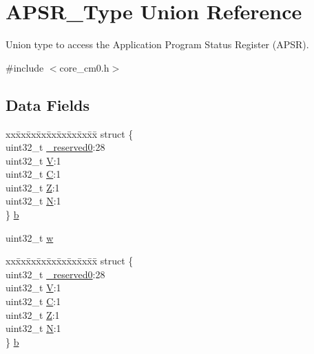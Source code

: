 \hypertarget{union_a_p_s_r___type}{}\section{A\+P\+S\+R\+\_\+\+Type Union Reference}
\label{union_a_p_s_r___type}


Union type to access the Application Program Status Register (A\+P\+SR).  




{\ttfamily \#include $<$core\+\_\+cm0.\+h$>$}

\subsection*{Data Fields}
\begin{DoxyCompactItemize}
\item 
\begin{tabbing}
xx\=xx\=xx\=xx\=xx\=xx\=xx\=xx\=xx\=\kill
struct \{\\
\>uint32\_t \mbox{\hyperlink{union_a_p_s_r___type_ac8a6a13838a897c8d0b8bc991bbaf7c1}{\_reserved0}}:28\\
\>uint32\_t \mbox{\hyperlink{union_a_p_s_r___type_acd4a2b64faee91e4a9eef300667fa222}{V}}:1\\
\>uint32\_t \mbox{\hyperlink{union_a_p_s_r___type_a7a1caf92f32fe9ebd8d1fe89b06c7776}{C}}:1\\
\>uint32\_t \mbox{\hyperlink{union_a_p_s_r___type_a5ae954cbd9986cd64625d7fa00943c8e}{Z}}:1\\
\>uint32\_t \mbox{\hyperlink{union_a_p_s_r___type_abae0610bc2a97bbf7f689e953e0b451f}{N}}:1\\
\} \mbox{\hyperlink{union_a_p_s_r___type_a2e5b85cff450c7f92c7388dd09f10065}{b}}\\

\end{tabbing}\item 
uint32\+\_\+t \mbox{\hyperlink{union_a_p_s_r___type_ad0fb62e7a08e70fc5e0a76b67809f84b}{w}}
\item 
\begin{tabbing}
xx\=xx\=xx\=xx\=xx\=xx\=xx\=xx\=xx\=\kill
struct \{\\
\>uint32\_t \mbox{\hyperlink{union_a_p_s_r___type_ac8a6a13838a897c8d0b8bc991bbaf7c1}{\_reserved0}}:28\\
\>uint32\_t \mbox{\hyperlink{union_a_p_s_r___type_acd4a2b64faee91e4a9eef300667fa222}{V}}:1\\
\>uint32\_t \mbox{\hyperlink{union_a_p_s_r___type_a7a1caf92f32fe9ebd8d1fe89b06c7776}{C}}:1\\
\>uint32\_t \mbox{\hyperlink{union_a_p_s_r___type_a5ae954cbd9986cd64625d7fa00943c8e}{Z}}:1\\
\>uint32\_t \mbox{\hyperlink{union_a_p_s_r___type_abae0610bc2a97bbf7f689e953e0b451f}{N}}:1\\
\} \mbox{\hyperlink{union_a_p_s_r___type_a398a87eafed8dea4e666d03278e69b74}{b}}\\


\end{tabbing}
\end{DoxyCompactItemize}
